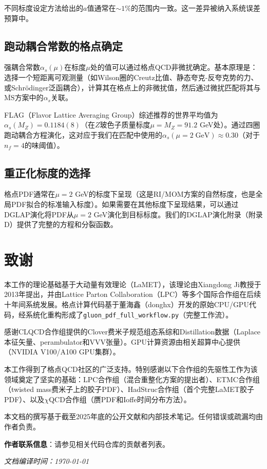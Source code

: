 \documentclass[11pt,a4paper]{ctexart}
\begin{document}
不同标度设定方法给出的$a$值通常在$\sim 1\%$的范围内一致。这一差异被纳入系统误差预算中。

\subsection{跑动耦合常数的格点确定}

强耦合常数$\alpha_s(\mu)$在标度$\mu$处的值可以通过格点QCD非微扰确定。基本原理是：选择一个短距离可观测量（如Wilson圈的Creutz比值、静态夸克-反夸克势的力、或Schr\"odinger泛函耦合），计算其在格点上的非微扰值，然后通过微扰匹配将其与$\overline{\text{MS}}$方案中的$\alpha_s$关联。

FLAG（Flavor Lattice Averaging Group）综述推荐的世界平均值为$\alpha_s(M_Z) = 0.1184(8)$（在$Z$玻色子质量标度$\mu = M_Z = 91.2$ GeV处）。通过四圈跑动耦合方程演化，这对应于我们在匹配中使用的$\alpha_s(\mu = 2\;\text{GeV}) \approx 0.30$（对于$n_f = 4$的味阈值）。

\subsection{重正化标度的选择}

格点PDF通常在$\mu = 2$ GeV的标度下呈现（这是RI/MOM方案的自然标度，也是全局PDF拟合的标准输入标度）。如果需要在其他标度下呈现结果，可以通过DGLAP演化将PDF从$\mu = 2$ GeV演化到目标标度。我们的DGLAP演化附录（附录D）提供了完整的方程和分裂函数。


\section*{致谢}

本工作的理论基础基于大动量有效理论（LaMET），该理论由Xiangdong Ji教授于2013年提出，并由Lattice Parton Collaboration（LPC）等多个国际合作组在后续十年间系统发展。格点计算代码基于董海鑫（donghx）开发的原始CPU/GPU代码，经系统化重构形成了\texttt{gluon\_pdf\_full\_workflow.py}（完整工作流）。

感谢CLQCD合作组提供的Clover费米子规范组态系综和Distillation数据（Laplace本征矢量、perambulator和VVV张量）。GPU计算资源由相关超算中心提供（NVIDIA V100/A100 GPU集群）。

本工作得到了格点QCD社区的广泛支持。特别感谢以下合作组的先驱性工作为该领域奠定了坚实的基础：LPC合作组（混合重整化方案的提出者）、ETMC合作组（twisted mass费米子上的胶子PDF）、HadStruc合作组（首个完整LaMET胶子PDF）、以及$\chi$QCD合作组（赝PDF和Ioffe时间分布方法）。

本文档的撰写基于截至2025年底的公开文献和内部技术笔记。任何错误或疏漏均由作者负责。

\vspace{1cm}
\noindent\textbf{作者联系信息}：请参见相关代码仓库的贡献者列表。

\vspace{0.5cm}
\noindent\textit{文档编译时间：\today}
\end{document}
